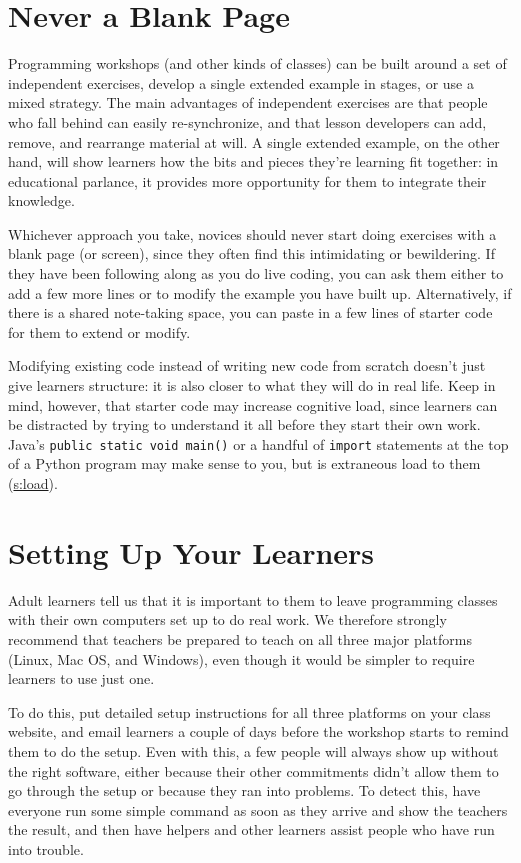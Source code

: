 \section{Never a Blank Page}\label{s:classroom-blank}

Programming workshops (and other kinds of classes) can be built around a
set of independent exercises, develop a single extended example in
stages, or use a mixed strategy. The main advantages of independent
exercises are that people who fall behind can easily re-synchronize, and
that lesson developers can add, remove, and rearrange material at will.
A single extended example, on the other hand, will show learners how the
bits and pieces they're learning fit together: in educational parlance,
it provides more opportunity for them to integrate their knowledge.

Whichever approach you take, novices should never start doing exercises
with a blank page (or screen), since they often find this intimidating
or bewildering. If they have been following along as you do live coding,
you can ask them either to add a few more lines or to modify the example
you have built up. Alternatively, if there is a shared note-taking
space, you can paste in a few lines of starter code for them to extend
or modify.

Modifying existing code instead of writing new code from scratch doesn't
just give learners structure: it is also closer to what they will do in
real life. Keep in mind, however, that starter code may increase
cognitive load, since learners can be distracted by trying to understand
it all before they start their own work. Java's \texttt{public\ static\ void\ main()} or a handful of \texttt{import} statements at the top of a Python
program may make sense to you, but is extraneous load to them
(\protect\hyperlink{CHAPTER}{s:load}).

\section{Setting Up Your Learners}\label{s:classroom-setup}

Adult learners tell us that it is important to them to leave programming
classes with their own computers set up to do real work. We therefore
strongly recommend that teachers be prepared to teach on all three major
platforms (Linux, Mac OS, and Windows), even though it would be simpler
to require learners to use just one.

To do this, put detailed setup instructions for all three platforms on
your class website, and email learners a couple of days before the
workshop starts to remind them to do the setup. Even with this, a few
people will always show up without the right software, either because
their other commitments didn't allow them to go through the setup or
because they ran into problems. To detect this, have everyone run some
simple command as soon as they arrive and show the teachers the result,
and then have helpers and other learners assist people who have run into
trouble.

